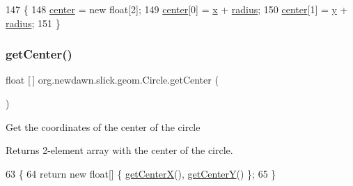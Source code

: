 \begin{DoxyCode}
147                                 \{
148         \mbox{\hyperlink{classorg_1_1newdawn_1_1slick_1_1geom_1_1_shape_a15ecde3336c4310cd927d766bb9a0b3b}{center}} = \textcolor{keyword}{new} \textcolor{keywordtype}{float}[2];
149         \mbox{\hyperlink{classorg_1_1newdawn_1_1slick_1_1geom_1_1_shape_a15ecde3336c4310cd927d766bb9a0b3b}{center}}[0] = \mbox{\hyperlink{classorg_1_1newdawn_1_1slick_1_1geom_1_1_shape_a3e985bfff386c15a4efaad03d8ad60d3}{x}} + \mbox{\hyperlink{classorg_1_1newdawn_1_1slick_1_1geom_1_1_circle_a4ca88ec1c6b329912a60e4dd02ccdf5a}{radius}};
150         \mbox{\hyperlink{classorg_1_1newdawn_1_1slick_1_1geom_1_1_shape_a15ecde3336c4310cd927d766bb9a0b3b}{center}}[1] = \mbox{\hyperlink{classorg_1_1newdawn_1_1slick_1_1geom_1_1_shape_a9f934baded6a1b65ebb69e7e5f80ea00}{y}} + \mbox{\hyperlink{classorg_1_1newdawn_1_1slick_1_1geom_1_1_circle_a4ca88ec1c6b329912a60e4dd02ccdf5a}{radius}};
151     \}
\end{DoxyCode}
\mbox{\label{classorg_1_1newdawn_1_1slick_1_1geom_1_1_circle_a8a20aea1b64846598f0b641518261721}} 
\subsubsection{\texorpdfstring{get\+Center()}{getCenter()}}
{\footnotesize\ttfamily float \mbox{[}$\,$\mbox{]} org.\+newdawn.\+slick.\+geom.\+Circle.\+get\+Center (\begin{DoxyParamCaption}{ }\end{DoxyParamCaption})\hspace{0.3cm}{\ttfamily [inline]}}

Get the coordinates of the center of the circle

\begin{DoxyReturn}{Returns}
2-\/element array with the center of the circle. 
\end{DoxyReturn}

\begin{DoxyCode}
63                                \{
64         \textcolor{keywordflow}{return} \textcolor{keyword}{new} \textcolor{keywordtype}{float}[] \{ \mbox{\hyperlink{classorg_1_1newdawn_1_1slick_1_1geom_1_1_circle_a54401470f8ee5f99c2013ca06e7cb057}{getCenterX}}(), \mbox{\hyperlink{classorg_1_1newdawn_1_1slick_1_1geom_1_1_circle_a3e64722eb886a7936ce75199e94e1e48}{getCenterY}}() \};
65     \}
\end{DoxyCode}
\mbox{\label{classorg_1_1newdawn_1_1slick_1_1geom_1_1_circle_a54401470f8ee5f99c2013ca06e7cb057}} 
